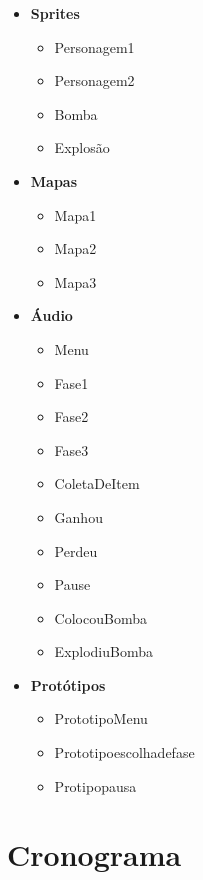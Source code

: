 \documentclass[12pt]{article}
\begin{document}
	\begin{itemize}
		\item \textbf{Sprites}
			\begin{itemize}

				\item Personagem1
				\item Personagem2
				\item Bomba
				\item Explosão

			\end{itemize}
			
		\item \textbf{Mapas}
			\begin{itemize}

				\item Mapa1
				\item Mapa2
				\item Mapa3

			\end{itemize}

		\item \textbf{Áudio}
			\begin{itemize}

				\item Menu
				\item Fase1
				\item Fase2
				\item Fase3
				\item ColetaDeItem
				\item Ganhou
				\item Perdeu
				\item Pause
				\item ColocouBomba
				\item ExplodiuBomba

			\end{itemize}

		\item \textbf{Protótipos}
			\begin{itemize}

				\item PrototipoMenu
				\item Prototipoescolhadefase
				\item Protipopausa

			\end{itemize}
	\end{itemize}

\section{Cronograma}
\end{document}
